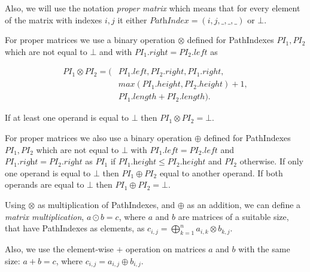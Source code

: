 Also, we will use the notation \textit{proper matrix} which means that for every element of the matrix with indexes $i,j$ it either $\textit{PathIndex} = (i,j,\_,\_,\_)$ or $\bot$.

For proper matrices we use a binary operation $\otimes$ defined for PathIndexes \mbox{$PI_1, PI_2$} which are not equal to $\bot$ and with $PI_1.\textit{right} = PI_2.\textit{left}$ as 

\begin{align*}
PI_1 \otimes PI_2 = (&PI_1.left, PI_2.right, PI_1.right, \\
                     &max(PI_1.height, PI_2.height)+1,\\
                     &PI_1.length + PI_2.length).
\end{align*}

If at least one operand is equal to $\bot$ then $PI_1 \otimes PI_2 = \bot$.

For proper matrices we also use a binary operation $\oplus$ defined for PathIndexes \mbox{$PI_1, PI_2$} which are not equal to $\bot$ with $PI_1.\textit{left} = PI_2.\textit{left}$ and $PI_1.\textit{right} = PI_2.\textit{right}$ as $PI_1$ if $PI_1.\textit{height} \leq PI_2.\textit{height}$ and $PI_2$ otherwise. If only one operand is equal to $\bot$ then $PI_1 \oplus PI_2$ equal to another operand. If both operands are equal to $\bot$ then $PI_1 \oplus PI_2 = \bot$.

Using $\otimes$ as multiplication of PathIndexes, and $\oplus$ as an addition, we can define a \emph{matrix multiplication}, \mbox{$a \odot b = c$}, where $a$ and $b$ are matrices of a suitable size, that have PathIndexes as elements, as $c_{i,j} = \bigoplus^{n}_{k=1}{a_{i,k} \otimes b_{k,j}}.$

Also, we use the element-wise $+$ operation on matrices $a$ and $b$ with the same size: \mbox{$a + b = c$}, where $c_{i,j} = a_{i,j} \oplus b_{i,j}.$
